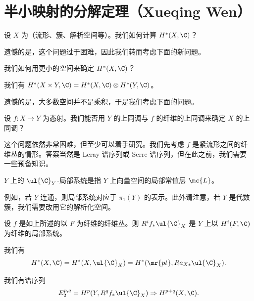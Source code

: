 \section{半小映射的分解定理（Xueqing Wen）}%
\label{sec:Decomposition theorem for semi-small maps (Xueqing Wen)}

\begin{quest}
    设 \(X\) 为（流形、簇、解析空间等）。我们如何计算 \(H^*(X, \C)\)？
\end{quest}

遗憾的是，这个问题过于困难，因此我们转而考虑下面的新问题。

\begin{quest}
    我们如何用更小的空间来确定 \(H^*(X, \C)\)？
\end{quest}

\begin{thm}[K\"unneth 公式]
    我们有 \(H^*(X \times Y, \C) = H^*(X, \C) \otimes H^*(Y, \C)\)。
\end{thm}

遗憾的是，大多数空间并不是乘积，于是我们考虑下面的问题。

\begin{quest}
    设 \(f \colon X \to Y\) 为态射。我们能否用 \(Y\) 的上同调与 \(f\) 的纤维的上同调来确定 \(X\) 的上同调？
\end{quest}

这个问题依然非常困难，但至少可以着手研究。我们先考虑 \(f\) 是紧流形之间的纤维丛的情形。答案当然是 Leray 谱序列或 Serre 谱序列，但在此之前，我们需要一些预备知识。

\begin{defn}
    \(Y\) 上的 \(\ul{\C}_Y\)-局部系统是指 \(Y\) 上向量空间的局部常值层 \(\mc{L}\)。
\end{defn}

例如，若 \(Y\) 连通，则局部系统对应于 \(\pi_1(Y)\) 的表示。此外请注意，若 \(Y\) 是代数簇，我们需要改用它的解析化空间。

\begin{exm}
    设 \(f\) 是如上所述的以 \(F\) 为纤维的纤维丛。则 \(R^i f_* \ul{\C}_X\) 是 \(Y\) 上以 \(H^i(F, \C)\) 为纤维的局部系统。
\end{exm}

\begin{prop}
    我们有
    \[ H^*(X, \C) = H^*(X, \ul{\C}_X) = H^*(\mr{pt}, R a_{X*} \ul{\C}_X). \]
\end{prop}

\begin{thm}
    我们有谱序列
    \[ E_2^{p,q} = H^p(Y, R^q f_* \ul{\C}_X) \Rightarrow H^{p+q}(X, \C). \]
\end{thm}

